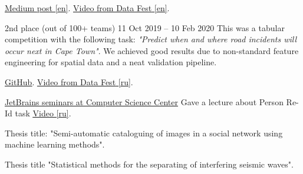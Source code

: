 \documentclass[10pt,a4paper,ragged2e,withhyper]{altacv}
\begin{document}
\begin{paracol}{2}
\href{https://medium.com/pytorch/metric-learning-with-catalyst-8c8337dfab1a}{\underline{Medium post} [en]}. \href{https://www.youtube.com/watch?v=a7sDJMDatZ4}{\underline{Video from Data Fest} [en]}.

\divider

{2nd place (out of 100+ teams)}
{11 Oct 2019 -- 10 Feb 2020}{}
This was a tabular competition with the following task: \textit{"Predict when and where road incidents will occur next in Cape Town"}. We achieved good results due to non-standard feature engineering for spatial data and a neat validation pipeline.
\smallskip

\href{https://github.com/AlekseySh/uber_competition}{\underline{GitHub}}.
\href{https://youtu.be/CliQ-EiYv5A}{\underline{Video from Data Fest} [ru]}.

\divider

\cvevent
{\href{https://research.jetbrains.org/groups/plt_lab/seminars}{JetBrains seminars at Computer Science Center}}
{Gave a lecture about Person Re-Id task}
{}
{}
{\href{https://youtu.be/O8qtBYeOSKE}{\underline{Video} [ru]}.}

\switchcolumn


\divider


\divider


\cvtag{\LaTeX}


Thesis title: "Semi-automatic cataloguing of images in a social network using machine learning methods".

\divider

Thesis title "Statistical methods for the separating of interfering seismic waves".

\begin{itemize}


\end{itemize}
\end{paracol}
\end{document}
